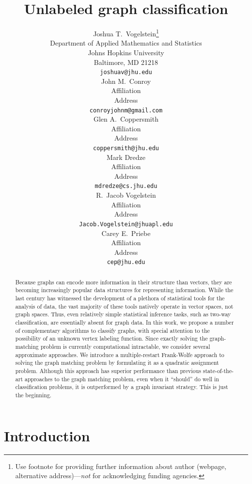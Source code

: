 \documentclass{article} %
\title{Unlabeled graph classification}
\author{
Joshua T.~Vogelstein\thanks{ Use footnote for providing further information
about author (webpage, alternative address)---\emph{not} for acknowledging
funding agencies.} \\
Department of Applied Mathematics and Statistics\\
Johns Hopkins University\\
Baltimore, MD 21218 \\
\texttt{joshuav@jhu.edu} \\
\And
John M.~Conroy \\
Affiliation \\
Address \\
\texttt{conroyjohnm@gmail.com} \\
\AND
Glen A.~Coppersmith \\
Affiliation \\
Address \\
\texttt{coppersmith@jhu.edu} \\
\And
Mark Dredze \\
Affiliation \\
Address \\
\texttt{mdredze@cs.jhu.edu} \\
\And
R.~Jacob Vogelstein \\
Affiliation \\
Address \\
\texttt{Jacob.Vogelstein@jhuapl.edu} \\
\And
Carey E.~Priebe \\
Affiliation \\
Address \\
\texttt{cep@jhu.edu} \\
}
\begin{document}
 
\maketitle

\begin{abstract}
Because graphs can encode more information in their structure than vectors, they are becoming increasingly popular data structures for representing information.  While the last century has witnessed the development of a plethora of statistical tools for the analysis of data, the vast majority of these tools natively operate in vector spaces, not graph spaces.  Thus, even relatively simple statistical inference tasks, such as two-way classification,  are essentially absent for graph data.  In this work, we propose a number of complementary algorithms to classify graphs, with special attention to the possibility of an unknown vertex labeling function.  Since exactly solving the graph-matching problem is currently computational intractable, we consider several approximate approaches.  We introduce a multiple-restart Frank-Wolfe approach to solving the graph matching problem by formulating it as a quadratic assignment problem.  Although this approach has superior performance than previous state-of-the-art approaches to the graph matching problem, even when it ``should'' do well in classification problems, it is outperformed by a graph invariant strategy.  This is just the beginning. 
\end{abstract}

\section{Introduction}
\end{document}
